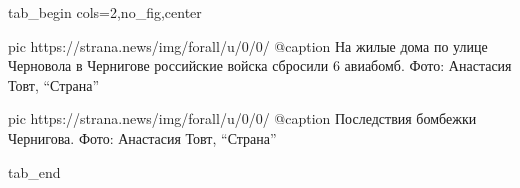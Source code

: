  
 
 
 
 


\ifcmt
  tab_begin cols=2,no_fig,center

     pic https://strana.news/img/forall/u/0/0/%
		 @caption На жилые дома по улице Черновола в Чернигове российские войска сбросили 6 авиабомб. Фото: Анастасия Товт, \enquote{Страна}

		 pic https://strana.news/img/forall/u/0/0/%
		 @caption Последствия бомбежки Чернигова. Фото: Анастасия Товт, \enquote{Страна}

  tab_end
\fi
